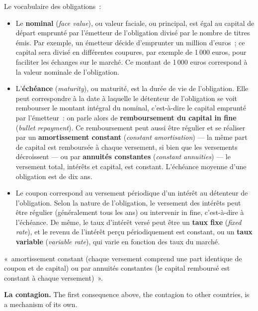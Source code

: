 Le vocabulaire des obligations~:
\begin{itemize}
  \item Le \textbf{nominal} (\textit{face value}), ou valeur faciale, ou
    principal, est égal au capital de départ emprunté par l'émetteur de
    l'obligation divisé par le nombre de titres émis. Par exemple, un émetteur
    décide d'emprunter un million d'euros~; ce capital sera divisé en
    différentes coupures, par exemple de 1\,000 euros, pour faciliter les
    échanges sur le marché. Ce montant de 1\,000 euros correspond à la valeur
    nominale de l'obligation.
  \item L'\textbf{échéance} (\textit{maturity}), ou maturité, est la durée de
    vie de l'obligation. Elle peut correspondre à la date à laquelle le
    détenteur de l'obligation se voit rembourser le montant intégral du nominal,
    c'est-à-dire le capital emprunté par l'émetteur~: on parle alors de
    \textbf{remboursement du capital in fine} (\textit{bullet repayment}). Ce
    remboursement peut aussi être régulier et se réaliser par un
    \textbf{amortissement constant} (\textit{constant amortisation}) --- la même
    part de capital est remboursée à chaque versement, si bien que les
    versements décroissent --- ou par \textbf{annuités constantes}
    (\textit{constant annuities}) --- le versement total, intérêts et capital,
    est constant. L'échéance moyenne d'une obligation est de dix ans.
  \item Le coupon correspond au versement périodique d'un intérêt au détenteur
    de l'obligation. Selon la nature de l'obligation, le versement des intérêts
    peut être régulier (généralement tous les ans) ou intervenir in fine,
    c'est-à-dire à l'échéance. De même, le taux d'intérêt versé peut être un
    \textbf{taux fixe} (\textit{fixed rate}), et le revenu de l'intérêt perçu
    périodiquement est constant, ou un \textbf{taux variable}
    (\textit{variable rate}), qui varie en fonction des taux du marché.
\end{itemize}

\begin{remark}
  «~amortissement constant (chaque versement comprend une part identique de
  coupon et de capital) ou par annuités constantes (le capital remboursé est
  constant à chaque versement)~».
\end{remark}

\textbf{La contagion.} The first consequence above, the contagion to other
countries, is a mechanism of its own.


